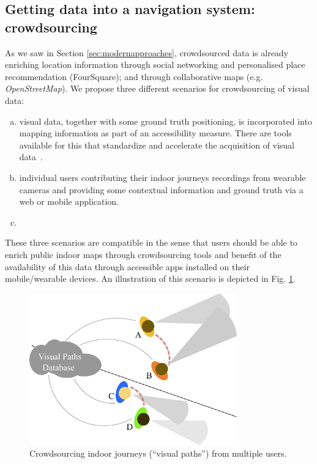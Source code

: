 \subsection{Getting data into a navigation system: crowdsourcing}
As we saw in Section \ref{sec:modernapproaches}, crowdsourced data is already enriching location information through social networking and personalised place recommendation (FourSquare); and through collaborative maps (e.g. {\it OpenStreetMap}). We propose three different scenarios for crowdsourcing of visual data:
\begin{enumerate}[a)] 
\item  visual data, together with some ground truth positioning, is incorporated into mapping information as part of an accessibility measure. There are tools available for this that standardize and accelerate the acquisition of visual data~\citep{navvisTrolley}.

\item individual users contributing their indoor journeys recordings from wearable cameras and providing some contextual information and ground truth via a web or mobile application. 

\item {}

\end{enumerate}



These three scenarios are compatible in the sense that users should be able to enrich public indoor maps through crowdsourcing tools and benefit of the availability of this data through accessible apps installed on their mobile/wearable devices. An illustration of this scenario is depicted in Fig. \ref{fig:associatingViews}.

\begin{figure}[h]
\centering
\includegraphics[width=0.8\textwidth]{gfx/Chapter06/AssociatingViews.pdf}
\caption{Crowdsourcing indoor journeys (``visual paths'') from multiple users.}
\label{fig:associatingViews}
\end{figure}

